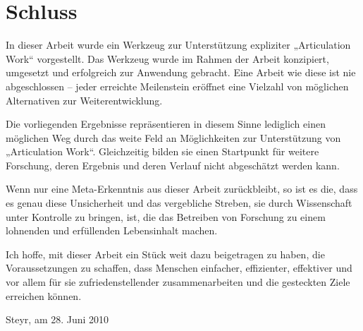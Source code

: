 
\section{Schluss}
\label{sec:schluss}

In dieser Arbeit wurde ein Werkzeug zur Unterstützung expliziter „Articulation Work“ vorgestellt. Das Werkzeug wurde im Rahmen der Arbeit konzipiert, umgesetzt und erfolgreich zur Anwendung gebracht. Eine Arbeit wie diese ist nie abgeschlossen -- jeder erreichte Meilenstein eröffnet eine Vielzahl von möglichen Alternativen zur Weiterentwicklung. 

Die vorliegenden Ergebnisse repräsentieren in diesem Sinne lediglich einen möglichen Weg durch das weite Feld an Möglichkeiten zur Unterstützung von „Articulation Work“. Gleichzeitig bilden sie einen Startpunkt für weitere Forschung, deren Ergebnis und deren Verlauf nicht abgeschätzt werden kann. 

Wenn nur eine Meta-Erkenntnis aus dieser Arbeit zurückbleibt, so ist es die, dass es genau diese Unsicherheit und das vergebliche Streben, sie durch Wissenschaft unter Kontrolle zu bringen, ist, die das Betreiben von Forschung zu einem lohnenden und erfüllenden Lebensinhalt machen. 

Ich hoffe, mit dieser Arbeit ein Stück weit dazu beigetragen zu haben, die Voraussetzungen zu schaffen, dass Menschen einfacher, effizienter, effektiver und vor allem für sie zufriedenstellender zusammenarbeiten und die gesteckten Ziele erreichen können.

\begin{flushright}
 Steyr, am 28. Juni 2010
\end{flushright}

